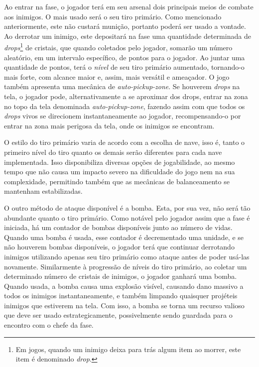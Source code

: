 Ao entrar na fase, o jogador terá em seu arsenal dois principais meios de combate aos inimigos. O mais usado será o seu tiro primário. Como mencionado anteriormente, este não custará munição, portanto poderá ser usado a vontade. Ao derrotar um inimigo, este depositará na fase uma quantidade determinada de \textit{drops}\footnote{
    Em jogos, quando um inimigo deixa para trás algum item ao morrer, este item é denominado \textit{drop}.
} de cristais, que quando coletados pelo jogador, somarão um número aleatório, em um intervalo específico, de pontos para o jogador. Ao juntar uma quantidade de pontos, terá o \textit{nível} de seu tiro primário aumentado, tornando-o mais forte, com alcance maior e, assim, mais versátil e ameaçador. O jogo também apresenta uma mecânica de \textit{auto-pickup-zone}. Se houverem \textit{drops} na tela, o jogador pode, alternativamente a se aproximar dos drops, entrar na zona no topo da tela denominada \textit{auto-pickup-zone}, fazendo assim com que todos os \textit{drops} vivos se direcionem instantaneamente ao jogador, recompensando-o por entrar na zona mais perigosa da tela, onde os inimigos se encontram.

O estilo do tiro primário varia de acordo com a escolha de nave, isso é, tanto o primeiro nível do tiro quanto os demais serão diferentes para cada nave implementada. Isso disponibiliza diversas opções de jogabilidade, ao mesmo tempo que não causa um impacto severo na dificuldade do jogo nem na sua complexidade, permitindo também que as mecânicas de balanceamento se mantenham estabilizadas.

O outro método de ataque disponível é a bomba. Esta, por sua vez, não será tão abundante quanto o tiro primário. Como notável pelo jogador assim que a fase é iniciada, há um contador de bombas disponíveis junto ao número de vidas. Quando uma bomba é usada, esse contador é decrementado uma unidade, e se não houverem bombas disponíveis, o jogador terá que continuar derrotando inimigos utilizando apenas seu tiro primário como ataque antes de poder usá-las novamente. Similarmente à progressão de níveis do tiro primário, ao coletar um determinado número de cristais de inimigos, o jogador ganhará uma bomba. Quando usada, a bomba causa uma explosão visível, causando dano massivo a todos os inimigos instantaneamente, e também limpando quaisquer projéteis inimigos que estiverem na tela. Com isso, a bomba se torna um recurso valioso que deve ser usado estrategicamente, possivelmente sendo guardada para o encontro com o chefe da fase.

